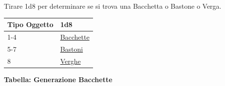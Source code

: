 \begin{multicols}{2}
{Tirare 1d8 per determinare se si trova una Bacchetta o Bastone o Verga.

\medskip

{\small\begin{tabularx}{\linewidth}{ll}
		\toprule
\textbf{Tipo Oggetto}&\textbf{1d8}\\
\toprule
1-4&\hyperlink{Bacchette}{Bacchette}\\
5-7&\hyperlink{Bastoni}{Bastoni}\\
8  &\hyperlink{Verghe}{Verghe}\\
\end{tabularx}}

\medskip

\textbf{Tabella: Generazione Bacchette}\hypertarget{Bacchette}{}

\medskip

}
\end{multicols}
